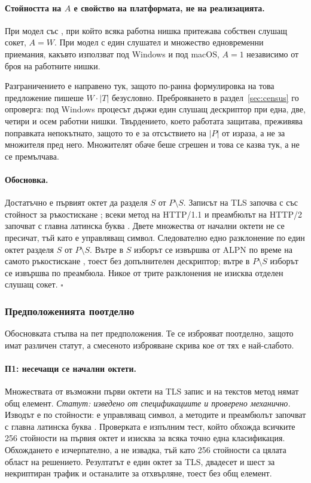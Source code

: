 \paragraph{Стойността на \(A\) е свойство на платформата, не на реализацията.} При модел със
, при който всяка работна нишка притежава собствен слушащ сокет, \(A = W\).
При модел с един слушател и множество едновременни приемания, какъвто използват 
под Windows и  под macOS, \(A = 1\) независимо от броя на работните нишки.

Разграничението е направено тук, защото по-ранна формулировка на това предложение пишеше
\(W \cdot |T|\) безусловно. Преброяването в раздел~\ref{sec:census} го опроверга: под Windows
процесът държи един слушащ дескриптор при една, две, четири и осем работни нишки. Твърдението,
което работата защитава, преживява поправката непокътнато, защото то е за отсъствието на
\(|P|\) от израза, а не за множителя пред него. Множителят обаче беше сгрешен и това се казва
тук, а не се премълчава.

\paragraph{Обосновка.} Достатъчно е първият октет да разделя \(S\) от \(P \setminus S\).
Записът на TLS започва с  със стойност  за ръкостискане
\cite{rfc8446}; всеки метод на HTTP/1.1 и преамбюлът на HTTP/2 започват с главна латинска
буква \cite{rfc9113}. Двете множества от начални октети не се пресичат, тъй като 
е управляващ символ. Следователно едно разклонение по един октет разделя \(S\) от
\(P \setminus S\). Вътре в \(S\) изборът се извършва от ALPN по време на самото ръкостискане
\cite{rfc7301}, тоест без допълнителен дескриптор; вътре в \(P \setminus S\) изборът се
извършва по преамбюла. Никое от трите разклонения не изисква отделен слушащ сокет. \(\square\)

\subsubsection{Предположенията поотделно}

Обосновката стъпва на пет предположения. Те се изброяват поотделно, защото имат различен
статут, а смесеното изброяване скрива кое от тях е най-слабото.

\paragraph{П1: несечащи се начални октети.} Множествата от възможни първи октети на TLS запис
и на текстов метод нямат общ елемент. \emph{Статут: изведено от спецификациите и проверено
механично.} Изводът е по стойности:  е управляващ символ, а методите и преамбюлът
започват с главна латинска буква \cite{rfc8446, rfc9113}. Проверката е изпълним тест, който
обхожда всичките 256 стойности на първия октет и изисква за всяка точно една класификация.
Обхождането е изчерпателно, а не извадка, тъй като 256 стойности са цялата област на
решението. Резултатът е един октет за TLS, двадесет и шест за некриптиран трафик и останалите
за отхвърляне, тоест без общ елемент.

